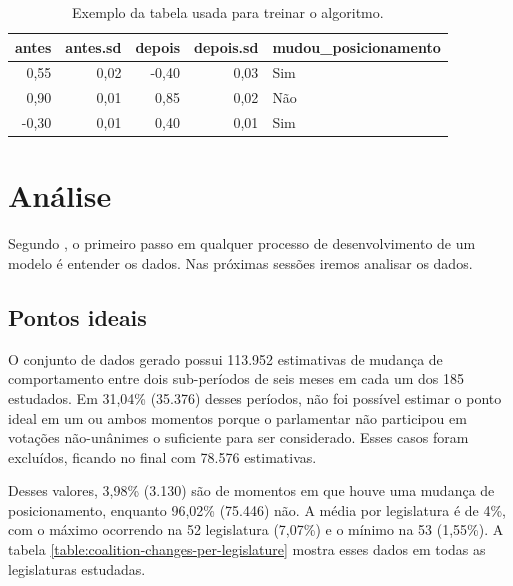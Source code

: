 \documentclass[a4paper,titlepage]{ppgi}\usepackage[]{graphicx}\usepackage[]{color}
\newenvironment{knitrout}{}{} %
\begin{document}
\begin{table}
\centering
\begin{knitrout}
\color{fgcolor}
\begin{tabular}{r|r|r|r|l}
\hline
antes & antes.sd & depois & depois.sd & mudou\_posicionamento\\
\hline
0,55 & 0,02 & -0,40 & 0,03 & Sim\\
\hline
0,90 & 0,01 & 0,85 & 0,02 & Não\\
\hline
-0,30 & 0,01 & 0,40 & 0,01 & Sim\\
\hline
\end{tabular}


\end{knitrout}
\caption{Exemplo da tabela usada para treinar o algoritmo.}
\label{table:dataset-final}
\end{table}


\section{Análise}
\label{sec:miolo:analise}

Segundo , o primeiro passo em qualquer processo de
desenvolvimento de um modelo é entender os dados. Nas próximas sessões iremos
analisar os dados.

\subsection{Pontos ideais}



O conjunto de dados gerado possui 113.952 estimativas de mudança
de comportamento entre dois sub-períodos de seis meses em cada um dos
185 estudados. Em 31,04\% (35.376) desses períodos, não foi possível
estimar o ponto ideal em um ou ambos momentos porque o parlamentar não
participou em votações não-unânimes o suficiente para ser considerado. Esses
casos foram excluídos, ficando no final com 78.576 estimativas.

Desses valores, 3,98\%
(3.130) são de momentos em que houve uma mudança de
posicionamento, enquanto 96,02\% (75.446) não. A média por legislatura é de
4\%, com o
máximo ocorrendo na 52\textordfeminine{} legislatura
(7,07\%) e o
mínimo na 53\textordfeminine{}
(1,55\%).
A tabela \ref{table:coalition-changes-per-legislature} mostra esses dados em
todas as legislaturas estudadas.
\end{document}
